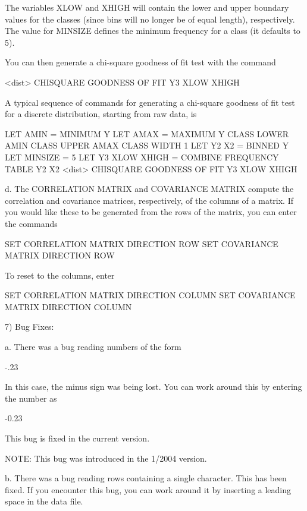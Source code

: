 {       The variables XLOW and XHIGH will contain the lower and upper
       boundary values for the classes (since bins will no longer be
       of equal length), respectively.  The value for MINSIZE defines
       the minimum frequency for a class (it defaults to 5).

       You can then generate a chi-square goodness of fit test
       with the command

            <dist> CHISQUARE GOODNESS OF FIT Y3 XLOW XHIGH

       A typical sequence of commands for generating a chi-square
       goodness of fit test for a discrete distribution, starting
       from raw data, is

            LET AMIN = MINIMUM Y
            LET AMAX = MAXIMUM Y
            CLASS LOWER AMIN
            CLASS UPPER AMAX
            CLASS WIDTH 1
            LET Y2 X2 = BINNED Y
            LET MINSIZE = 5
            LET Y3 XLOW XHIGH = COMBINE FREQUENCY TABLE Y2 X2
            <dist> CHISQUARE GOODNESS OF FIT Y3 XLOW XHIGH

    d. The CORRELATION MATRIX and COVARIANCE MATRIX compute the
       correlation and covariance matrices, respectively, of the
       columns of a matrix.  If you would like these to be
       generated from the rows of the matrix, you can enter the
       commands

           SET CORRELATION MATRIX DIRECTION ROW
           SET COVARIANCE  MATRIX DIRECTION ROW

       To reset to the columns, enter

           SET CORRELATION MATRIX DIRECTION COLUMN
           SET COVARIANCE  MATRIX DIRECTION COLUMN

 7) Bug Fixes:

    a. There was a bug reading numbers of the form

         -.23

       In this case, the minus sign was being lost.  You can
       work around this by entering the number as

         -0.23

      This bug is fixed in the current version.

      NOTE: This bug was introduced in the 1/2004 version.

   b. There was a bug reading rows containing a single character.
      This has been fixed.  If you encounter this bug, you can
      work around it by inserting a leading space in the data
      file.

}
